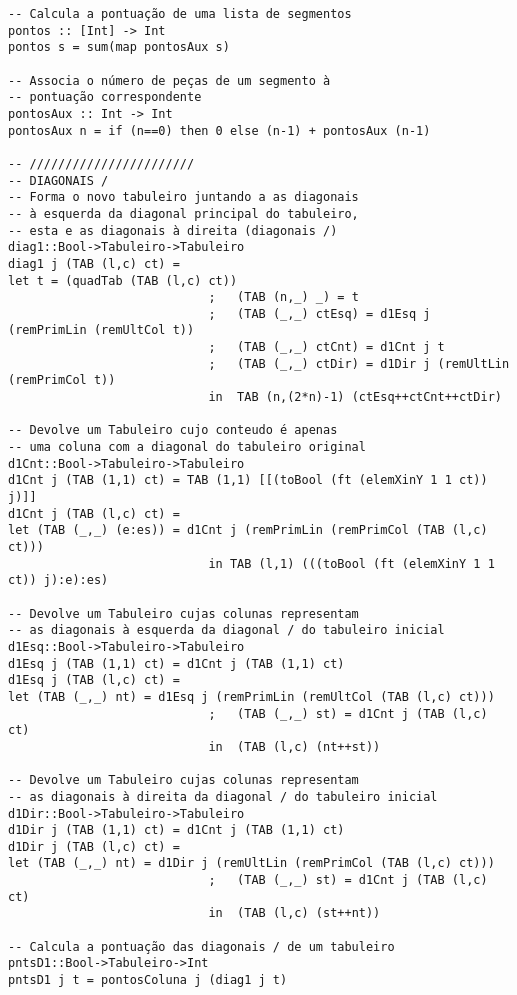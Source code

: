 \documentclass[a4paper,titlepage]{scrreprt}
\begin{document}
\begin{verbatim}
-- Calcula a pontuação de uma lista de segmentos
pontos :: [Int] -> Int
pontos s = sum(map pontosAux s)

-- Associa o número de peças de um segmento à
-- pontuação correspondente
pontosAux :: Int -> Int
pontosAux n = if (n==0) then 0 else (n-1) + pontosAux (n-1)

-- ///////////////////////
-- DIAGONAIS /
-- Forma o novo tabuleiro juntando a as diagonais
-- à esquerda da diagonal principal do tabuleiro,
-- esta e as diagonais à direita (diagonais /)
diag1::Bool->Tabuleiro->Tabuleiro
diag1 j (TAB (l,c) ct) = 	
let	t = (quadTab (TAB (l,c) ct))
							;	(TAB (n,_) _) = t
							;	(TAB (_,_) ctEsq) = d1Esq j (remPrimLin (remUltCol t))
							;	(TAB (_,_) ctCnt) = d1Cnt j t
							;	(TAB (_,_) ctDir) = d1Dir j (remUltLin (remPrimCol t))
							in	TAB (n,(2*n)-1) (ctEsq++ctCnt++ctDir)

-- Devolve um Tabuleiro cujo conteudo é apenas
-- uma coluna com a diagonal do tabuleiro original
d1Cnt::Bool->Tabuleiro->Tabuleiro
d1Cnt j (TAB (1,1) ct) = TAB (1,1) [[(toBool (ft (elemXinY 1 1 ct)) j)]]
d1Cnt j (TAB (l,c) ct) =	
let	(TAB (_,_) (e:es)) = d1Cnt j (remPrimLin (remPrimCol (TAB (l,c) ct)))
							in TAB (l,1) (((toBool (ft (elemXinY 1 1 ct)) j):e):es)

-- Devolve um Tabuleiro cujas colunas representam
-- as diagonais à esquerda da diagonal / do tabuleiro inicial
d1Esq::Bool->Tabuleiro->Tabuleiro
d1Esq j (TAB (1,1) ct) = d1Cnt j (TAB (1,1) ct)
d1Esq j (TAB (l,c) ct) = 	
let	(TAB (_,_) nt) = d1Esq j (remPrimLin (remUltCol (TAB (l,c) ct)))
							;	(TAB (_,_) st) = d1Cnt j (TAB (l,c) ct)
							in	(TAB (l,c) (nt++st))

-- Devolve um Tabuleiro cujas colunas representam
-- as diagonais à direita da diagonal / do tabuleiro inicial
d1Dir::Bool->Tabuleiro->Tabuleiro
d1Dir j (TAB (1,1) ct) = d1Cnt j (TAB (1,1) ct)
d1Dir j (TAB (l,c) ct) =	
let (TAB (_,_) nt) = d1Dir j (remUltLin (remPrimCol (TAB (l,c) ct)))
							;	(TAB (_,_) st) = d1Cnt j (TAB (l,c) ct)
							in	(TAB (l,c) (st++nt))

-- Calcula a pontuação das diagonais / de um tabuleiro
pntsD1::Bool->Tabuleiro->Int
pntsD1 j t = pontosColuna j (diag1 j t)


\end{verbatim}
\end{document}
